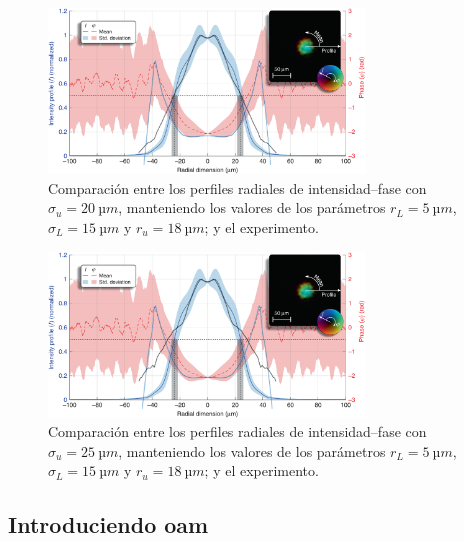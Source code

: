 \newpage

\begin{figure}[htbp]
  \centering
  \includegraphics[width=0.75\textwidth]{Figuras/anx_cmp_92.png}
  \caption*{Comparación entre los perfiles radiales de intensidad--fase con $\sigma_{u}=\qty{20}{µm}$, manteniendo los valores de los parámetros $r_{L}=\qty{5}{µm}$, $\sigma_{L}=\qty{15}{µm}$ y $r_{u}=\qty{18}{µm}$; y el experimento.}
\end{figure}

\begin{figure}[htbp]
  \centering
  \includegraphics[width=0.75\textwidth]{Figuras/anx_cmp_93.png}
  \caption*{Comparación entre los perfiles radiales de intensidad--fase con $\sigma_{u}=\qty{25}{µm}$, manteniendo los valores de los parámetros $r_{L}=\qty{5}{µm}$, $\sigma_{L}=\qty{15}{µm}$ y $r_{u}=\qty{18}{µm}$; y el experimento.}
\end{figure}

\subsection*{Introduciendo \acrshort{oam}}

